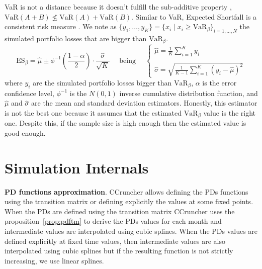 \documentclass[11pt,fleqn]{book} %
\begin{document}
VaR is not a distance because it doesn't fulfill the sub-additive property 
\cite{var:varbad}, $\text{VaR}(A+B) \nleq \text{VaR}(A)+\text{VaR}(B)$. 
Similar to VaR, Expected Shortfall is a consistent risk measure 
\cite{var:eshortfall}. We note as
$\{y_1, \ldots, y_K\} = \{x_i \mid x_i \ge \text{VaR}_{\beta} \}_{i=1,\dots,N}$ 
the simulated portfolio losses that are bigger than $\text{VaR}_{\beta}$.
\begin{displaymath}
	\text{ES}_{\beta} = \widehat{\mu} \pm \phi^{-1}\left(\frac{1-\alpha}{2}\right) \cdot \frac{\widehat{\sigma}}{\sqrt{K}}
	\quad \text{ being } \quad
	\left\{
	\begin{array}{l}
		\displaystyle
		\widehat{\mu} = \frac{1}{K} \sum_{i=1}^{K} y_i \\
		\\
		\displaystyle
		\widehat{\sigma} =
		\sqrt{\frac{1}{K-1} \sum_{i=1}^{K} \left( y_i - \widehat{\mu} \right)^2}
	\end{array}
	\right.
\end{displaymath}
where $y_i$ are the simulated portfolio losses bigger than $\text{VaR}_{\beta}$, 
$\alpha$ is the error confidence level, $\phi^{-1}$ is the $N(0,1)$ 
inverse cumulative distribution function, and $\widehat{\mu}$ and 
$\widehat{\sigma}$ are the mean and standard deviation estimators.
Honestly, this estimator is not the best one because it assumes that
the estimated $\text{VaR}_{\beta}$ value is the right one. Despite this, 
if the sample size is high enough then the estimated value is good enough.

\section{Simulation Internals}

\textbf{PD functions approximation}. CCruncher allows defining the PDs
functions using the transition matrix or defining explicitly the values
at some fixed points. When the PDs are defined using the transition matrix 
CCruncher uses the proposition~\ref{prop:pdftm} to derive the PDs values 
for each month and intermediate values are interpolated using cubic splines. 
When the PDs values are defined explicitly at fixed time values, then 
intermediate values are also interpolated using cubic splines but if the 
resulting function is not strictly increasing, we use linear splines.
\end{document}
